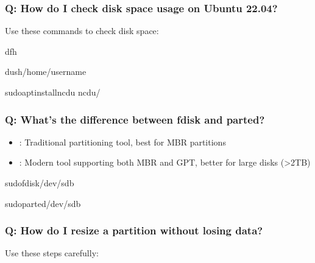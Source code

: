 \documentclass[letterpaper,10pt,english]{sphinxmanual}
\begin{document}
\subsubsection{Q: How do I check disk space usage on Ubuntu 22.04?}
\label{\detokenize{disk-management:q-how-do-i-check-disk-space-usage-on-ubuntu-22-04}}
\sphinxAtStartPar
{} Use these commands to check disk space:

\begin{sphinxVerbatim}[commandchars=\\\{\}]
df\PYGZhy{}h

du\PYGZhy{}sh/home/username

sudoaptinstallncdu
ncdu/
\end{sphinxVerbatim}


\subsubsection{Q: What’s the difference between fdisk and parted?}
\label{\detokenize{disk-management:q-what-s-the-difference-between-fdisk-and-parted}}
\sphinxAtStartPar
{}
\begin{itemize}
\item {} 
\sphinxAtStartPar
{}: Traditional partitioning tool, best for MBR partitions

\item {} 
\sphinxAtStartPar
{}: Modern tool supporting both MBR and GPT, better for large disks (\textgreater{}2TB)

\end{itemize}

\begin{sphinxVerbatim}[commandchars=\\\{\}]
sudofdisk/dev/sdb

sudoparted/dev/sdb
\end{sphinxVerbatim}


\subsubsection{Q: How do I resize a partition without losing data?}
\label{\detokenize{disk-management:q-how-do-i-resize-a-partition-without-losing-data}}
\sphinxAtStartPar
{} Use these steps carefully:
\end{document}
